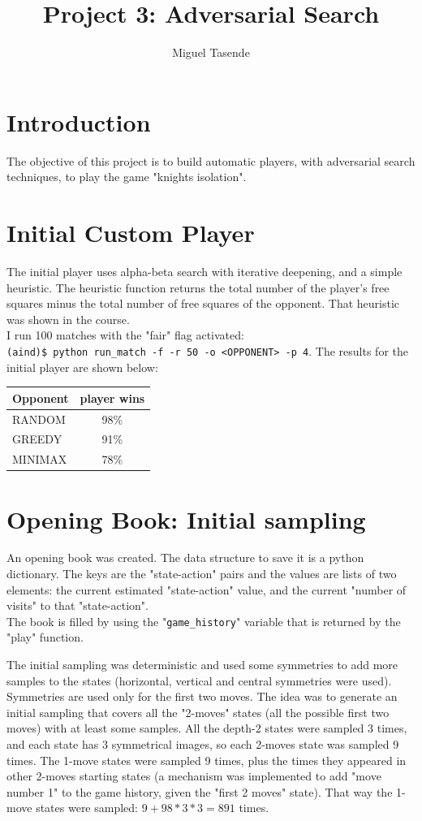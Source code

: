 \documentclass[a4paper,12pt]{article}
\title{\textbf{Project 3: Adversarial Search}}
\author{Miguel Tasende}
\begin{document}
\maketitle

\section{Introduction}
The objective of this project is to build automatic players, with adversarial search techniques, to play the game "knights isolation".

\section{Initial Custom Player}
The initial player uses alpha-beta search with iterative deepening, and a simple heuristic. The heuristic function returns the total number of the player's free squares minus the total number of free squares of the opponent. That heuristic was shown in the course.\\
I run 100 matches with the "fair" flag activated: \\
\verb+(aind)$ python run_match -f -r 50 -o <OPPONENT> -p 4+.
The results for the initial player are shown below:\\

\begin{tabular}{|l|c|}
 \hline
Opponent & player wins\\
\hline
RANDOM & 98\% \\
\hline
GREEDY & 91\% \\
\hline
MINIMAX & 78\% \\
\hline
\end{tabular}


\section{Opening Book: Initial sampling}
An opening book was created. The data structure to save it is a python dictionary. The keys are the "state-action" pairs and the values are lists of two elements: the current estimated "state-action" value, and the current "number of visits" to that "state-action".\\
The book is filled by using the "\verb+game_history+" variable that is returned by the "play" function.

The initial sampling was deterministic and used some symmetries to add more samples to the states (horizontal, vertical and central symmetries were used). Symmetries are used only for the first two moves. The idea was to generate an initial sampling that covers all the "2-moves" states (all the possible first two moves) with at least some samples. All the depth-2 states were sampled 3 times, and each state has 3 symmetrical images, so each 2-moves state was sampled 9 times. The 1-move states were sampled 9 times, plus the times they appeared in other 2-moves starting states (a mechanism was implemented to add "move number 1" to the game history, given the "first 2 moves" state). That way the 1-move states were sampled: $9 + 98 * 3 * 3 = 891$ times.\\
\end{document}
